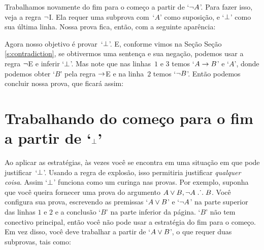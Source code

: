 \begin{fitchproof}
	\open
	\open
	\ellipsesline
	\close
	\close
\end{fitchproof}
Trabalhamos novamente do fim para o começo a partir de `$\neg A$'.  Para fazer isso, veja a regra $\neg$I. Ela requer uma subprova com~`$A$' como suposição, e `$\bot$' como sua última linha. Nossa prova fica, então, com a seguinte aparência:
 
\begin{fitchproof}
	\open
	\open
	\open{}
	\ellipsesline
	\close
	\close
	\close
\end{fitchproof}
 
Agora nosso objetivo é provar~`$\bot$'. E, conforme vimos na Seção Seção \ref{s:contradiction},  se obtivermos uma sentença e sua negação, podemos usar a regra $\neg$E e inferir `$\bot$'.
Mas note que nas linhas~$1$ e $3$ temos `$A \rightarrow B$' e `$A$', donde podemos obter `$B$' pela regra $\rightarrow$E e na linha~$2$ temos `$\neg B$'. Então podemos concluir nossa prova, que ficará assim:

\begin{fitchproof}
	\open
	\open
	\open{}
	\close
	\close
	\close
\end{fitchproof}


\section{Trabalhando do começo para o fim a partir de `$\bot$'}\label{sec:backred}

Ao aplicar as estratégias, às vezes você se encontra em uma situação em que pode justificar~`$\bot$'. Usando a regra de explosão, isso permitiria justificar \emph{qualquer coisa}. Assim `$\bot$' funciona como um curinga nas provas. Por exemplo, suponha que você queira fornecer uma prova do argumento $A \vee B, \neg A \mathrel{\ldotp\dot{}\,\ldotp} B$. Você configura sua prova, escrevendo as premissas `$A \vee B$' e `$\neg A$' na parte superior das linhas $1$ e $2$ e a conclusão `$B$' na parte inferior da página. `$B$' não tem conectivo principal, então você não pode usar a estratégia do fim para o começo. Em vez disso, você deve trabalhar a partir de `$A \vee B$', o que requer duas subprovas, tais como:


